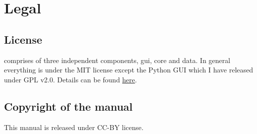 \chapter{Legal}
\section{License}
\simname comprises of three independent components, \simname gui, \simname core and \simname data.  In general everything is under the MIT license except the Python GUI which I have released under GPL v2.0. Details can be found \href{https://github.com/roderickmackenzie/gpvdm/blob/main/LICENSE.md}{here}.

\section{Copyright of the manual}
This manual is released under CC-BY license.



